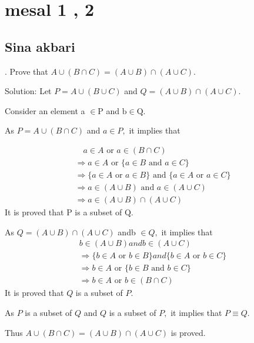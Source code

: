 \documentclass [7pt]{beamer}
\begin{document}
\small
\section*{mesal 1 , 2}
\subsection*{Sina akbari }	
\begin{frame}
. Prove that $A \cup(B \cap C)=(A \cup B) \cap(A \cup C)$.
\begin{flushleft}
Solution: Let $P=A \cup(B \cup C)$ and $Q=(A \cup B) \cap(A \cup C)$.

Consider an element a $\in \mathrm{P}$ and $\mathrm{b} \in \mathrm{Q}$. 


As $P=A \cup(B \cap C)$ and $a \in P,$ it implies that
\end{flushleft}
$$
\begin{array}{l}
	\quad a \in A \text { or } a \in(B \cap C) \\
	\Longrightarrow a \in A \text { or }\{a \in B \text { and } a \in C\} \\
	\Longrightarrow\{a \in A \text { or } a \in B\} \text { and }\{a \in A \text { or } a \in C\} \\
	\Longrightarrow a \in(A \cup B) \text { and } a \in(A \cup C) \\
	\Longrightarrow a \in(A \cup B) \cap(A \cup C)
\end{array}
$$
It is proved that $\mathrm{P}$ is a subset of $\mathrm{Q}$. 


As $Q=(A \cup B) \cap(A \cup C)$ andb $\in Q,$ it implies that
$$
\begin{array}{l}
	b \in(A \cup B) a n d b \in(A \cup C) \\
	\Longrightarrow\{b \in A \text { or } b \in B\} a n d\{b \in A \text { or } b \in C\} \\
	\Longrightarrow b \in A \text { or }\{b \in B \text { and } b \in C\} \\
	\Longrightarrow b \in A \text { or } b \in(B \cap C)
\end{array}
$$
It is proved that $Q$ is a subset of $P$.


As $P$ is a subset of $Q$ and $Q$ is a subset of $P,$ it implies that $P \equiv Q$. 


Thus $A \cup(B \cap C)=(A \cup B) \cap(A \cup C)$ is proved.
\end{frame}
\end{document}
